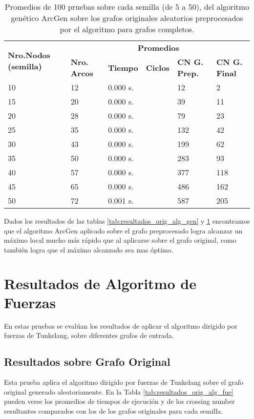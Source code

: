 \begin{table}[H]
	\caption{Promedios de 100 pruebas sobre cada semilla (de 5 a 50), del algoritmo genético ArcGen sobre los grafos originales aleatorios preprocesados por el algoritmo para grafos completos.}
	\label{tab:resultados_com_alg_gen}
	\begin{tabularx}{\linewidth}{|X|X|p{1.5cm}|p{1.5cm}|X|X|}
		\hline
		\multirow{2}{2cm}{\textbf{Nro.Nodos (semilla)}} & \multicolumn{5}{c|}{\textbf{Promedios}} \\
		\cline{2-6}
		& \textbf{Nro. Arcos} & \textbf{Tiempo} & \textbf{Ciclos} & \textbf{CN G. Prep.} & \textbf{CN G. Final} \\
		\hline
		10 & 12 & 0.000 s. & & 12 & 2 \\
		\hline
		15 & 20 & 0.000 s. & & 39 & 11 \\
		\hline
		20 & 28 & 0.000 s. & & 79 & 23 \\
		\hline
		25 & 35 & 0.000 s. & & 132 & 42 \\
		\hline
		30 & 43 & 0.000 s. & & 199 & 62 \\
		\hline
		35 & 50 & 0.000 s. & & 283 & 93 \\
		\hline
		40 & 57 & 0.000 s. & & 377 & 118 \\
		\hline
		45 & 65 & 0.000 s. & & 486 & 162 \\
		\hline
		50 & 72 & 0.001 s. & & 587 & 205 \\
		\hline
	\end{tabularx}
\end{table}

Dados los resultados de las tablas \ref{tab:resultados_orig_alg_gen} y \ref{tab:resultados_com_alg_gen} encontramos que el algoritmo ArcGen aplicado sobre el grafo preprocesado logra alcanzar un máximo local mucho más rápido que al aplicarse sobre el grafo original, como también logra que el máximo alcanzado sea mas óptimo.

\section{Resultados de Algoritmo de Fuerzas}
En estas pruebas se evalúan los resultados de aplicar el algoritmo dirigido por fuerzas de Tunkelang, sobre diferentes grafos de entrada.

\subsection{Resultados sobre Grafo Original}
Esta prueba aplica el algoritmo dirigido por fuerzas de Tunkelang sobre el grafo original generado aleatoriamente. En la Tabla \ref{tab:resultados_orig_alg_fue} pueden verse los promedios de tiempos de ejecución y de los crossing number resultantes comparados con los de los grafos originales para cada semilla.

